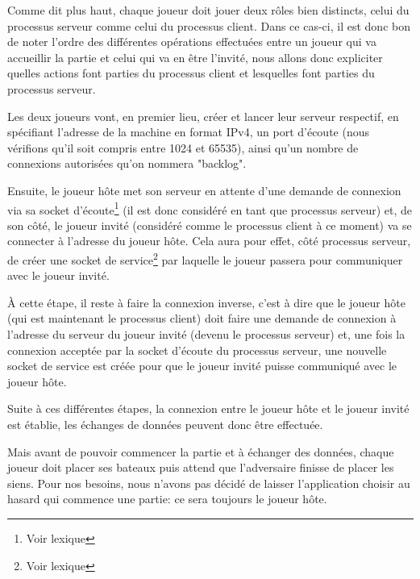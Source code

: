 			Comme dit plus haut, chaque joueur doit jouer deux rôles bien distincts, celui du processus serveur comme celui du processus client. Dans ce cas-ci, il est donc bon de noter l'ordre des différentes opérations effectuées entre un joueur qui va accueillir la partie et celui qui va en être l'invité, nous allons donc expliciter quelles actions font parties du processus client et lesquelles font parties du processus serveur. \newline			
			
			Les deux joueurs vont, en premier lieu, créer et lancer leur serveur respectif, en spécifiant l'adresse de la machine en format IPv4, un port d'écoute (nous vérifions qu'il soit compris entre 1024 et 65535), ainsi qu'un nombre de connexions autorisées qu'on nommera "backlog". \newline
			
			Ensuite, le joueur hôte met son serveur en attente d'une demande de connexion via sa socket d'écoute\footnote{Voir lexique} (il est donc considéré en tant que processus serveur) et, de son côté, le joueur invité (considéré comme le processus client à ce moment) va se connecter à l'adresse du joueur hôte. Cela aura pour effet, côté processus serveur, de créer une socket de service\footnote{Voir lexique} par laquelle le joueur passera pour communiquer avec le joueur invité. \newline
			
			À cette étape, il reste à faire la connexion inverse, c'est à dire que le joueur hôte (qui est maintenant le processus client) doit faire une demande de connexion à l'adresse du serveur du joueur invité (devenu le processus serveur) et, une fois la connexion acceptée par la socket d'écoute du processus serveur, une nouvelle socket de service est créée pour que le joueur invité puisse communiqué avec le joueur hôte.\newline
			
			Suite à ces différentes étapes, la connexion entre le joueur hôte et le joueur invité est établie, les échanges de données peuvent donc être effectuée.

			Mais avant de pouvoir commencer la partie et à échanger des données, chaque joueur doit placer ses bateaux puis attend que l'adversaire finisse de placer les siens. Pour nos besoins, nous n'avons pas décidé de laisser l'application choisir au hasard qui commence une partie: ce sera toujours le joueur hôte. \newline
			
